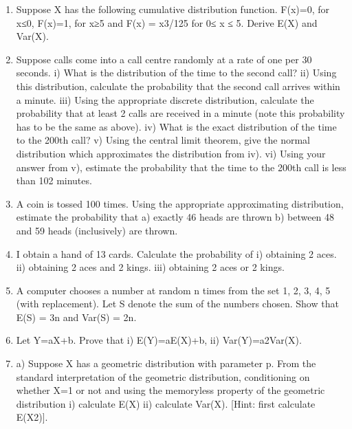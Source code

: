 \documentclass[a4paper,12pt]{article}
\begin{document}
\begin{enumerate}
\item 	Suppose X has the following cumulative distribution function. F(x)=0, for x≤0, 
	F(x)=1, for x≥5 and F(x) = x3/125 for 0≤ x ≤ 5. Derive E(X) and Var(X).
	
	
	
\item  Suppose calls come into a call centre randomly at a rate of one per 30 seconds.
	i) What is the distribution of the time to the second call?
	ii) Using this distribution, calculate the probability that the second call arrives within a minute. 
	iii) Using the appropriate discrete distribution, calculate the probability that at least 2 calls are received in a minute (note this probability has to be the same as above).
	iv) What is the exact distribution of the time to the 200th call?
	v) Using the central limit theorem, give the normal distribution which approximates the distribution from iv).
	vi) Using your answer from v), estimate the probability that the time to the 200th call is less than 102 minutes.
	
\item A coin is tossed 100 times. Using the appropriate approximating distribution, estimate the probability that
	a) exactly 46 heads are thrown
	b) between 48 and 59 heads (inclusively) are thrown.
\item	I obtain a hand of 13 cards. Calculate the probability of
	i) obtaining 2 aces.
	ii) obtaining 2 aces and 2 kings.
	iii) obtaining 2 aces or 2 kings.
	
\item A computer chooses a number at random n times from the set {1, 2, 3, 4, 5} (with replacement). Let S denote the sum of the numbers chosen. Show that
	E(S) = 3n and Var(S) = 2n.
	
\item	Let Y=aX+b. Prove that i) E(Y)=aE(X)+b, ii) Var(Y)=a2Var(X).
	
\item	a) Suppose X has a geometric distribution with parameter p. From the standard interpretation of the geometric distribution, conditioning on whether X=1 or not and using the memoryless property of the geometric distribution
	i)	calculate E(X)
	ii)	calculate Var(X). [Hint: first calculate E(X2)].
	

\end{enumerate}
\end{document}
